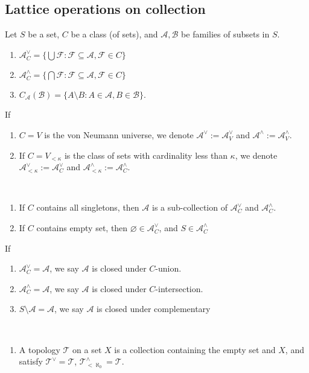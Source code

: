 \documentclass{treatise}
\begin{document}
\begin{shaded}
\section{Lattice operations on collection}
Let $S$ be a set, $C$ be a class (of sets), and $\mathcal{A}, \mathcal{B}$ be families of subsets in $S$.
\begin{enumerate}
    \item $\mathcal{A}_C^{\vee} = \{ \bigcup \mathcal{F} : \mathcal{F} \subseteq \mathcal{A}, \mathcal{F} \in C \}$
    \item $\mathcal{A}_C^{\wedge} = \{ \bigcap \mathcal{F} : \mathcal{F} \subseteq \mathcal{A}, \mathcal{F} \in C \}$
    \item $C_{\mathcal{A}}(\mathcal{B}) = \{ A \setminus B : A \in \mathcal{A}, B \in \mathcal{B} \}$.
\end{enumerate}
If
\begin{enumerate}
    \item $C = V$ is the von Neumann universe, we denote $\mathcal{A}^\vee := \mathcal{A}_V^\vee$ and $\mathcal{A}^\wedge := \mathcal{A}_V^\wedge$.
    \item If $C = V_{< \kappa}$ is the class of sets with cardinality less than $\kappa$, we denote
    $\mathcal{A}_{< \kappa}^\vee := \mathcal{A}_C^\vee$ and $\mathcal{A}_{< \kappa}^\wedge := \mathcal{A}_C^\wedge$.
\end{enumerate}
\begin{proposition} \ 
\begin{enumerate}
    \item If $C$ contains all singletons, then $\mathcal{A}$ is a sub-collection of $\mathcal{A}_C^{\vee}$ and $\mathcal{A}_C^{\wedge}$.
    \item If $C$ contains empty set, then $\varnothing \in \mathcal{A}_C^{\vee}$, and $S \in \mathcal{A}_C^{\wedge}$
\end{enumerate}
\end{proposition}
If
\begin{enumerate}
    \item $\mathcal{A}_C^{\vee} = \mathcal{A}$, we say $\mathcal{A}$ is closed under $C$-union.
    \item $\mathcal{A}_C^{\wedge} = \mathcal{A}$, we say $\mathcal{A}$ is closed under $C$-intersection.
    \item $S \setminus \mathcal{A} = \mathcal{A}$, we say $\mathcal{A}$ is closed under complementary
\end{enumerate}
\begin{example} \ 
\begin{enumerate}
    \item A topology $\mathcal{T}$ on a set $X$ is a collection containing the empty set and $X$, and satisfy $\mathcal{T}^{\vee} = \mathcal{T}$, $\mathcal{T}_{< \aleph_0}^{\wedge} = \mathcal{T}$.
\end{enumerate}
\end{example}


\end{shaded}
\end{document}
